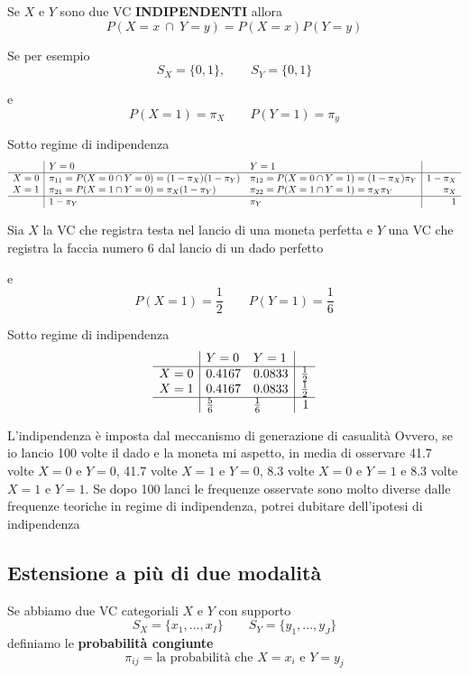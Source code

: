 \documentclass[
  11pt,
]{book}
\theoremstyle{mytheoremstyle}
\theoremstyle{mydefstyle}
\begin{document}
Se \(X\) e \(Y\) sono due VC \textbf{INDIPENDENTI} allora
\[P(X=x~\cap~Y=y)=P(X=x)P(Y=y)\]

Se per esempio
\[S_X=\{0,1\},\qquad S_Y=\{0,1\}\]

e
\[P(X=1)=\pi_X\qquad P(Y=1)=\pi_y\]

Sotto regime di indipendenza
\[
\begin{array}{c|ll|r}
 &Y=0 &Y=1 &\\
  \hline
  X=0 & \pi_{11}=P(X=0\cap Y=0) = (1-\pi_X)(1-\pi_Y)& 
  \pi_{12}=P(X=0\cap Y=1) =(1-\pi_X)\pi_Y & 1-\pi_X\\ 
  X=1 & \pi_{21}=P(X=1\cap Y=0)= \pi_X(1-\pi_Y)& 
  \pi_{22}=P(X=1\cap Y=1) =\pi_X\pi_Y & \pi_X\\ \hline
   & 1-\pi_Y & \pi_Y & 1\\ 
\end{array}
\]

Sia \(X\) la VC che registra testa nel lancio di una moneta perfetta e \(Y\) una VC che
registra la faccia numero 6 dal lancio di un dado perfetto

e
\[P(X=1)=\frac 1 2\qquad P(Y=1)=\frac 1 6\]

Sotto regime di indipendenza
\[
\begin{array}{c|ll|r}
 &Y=0 &Y=1 &\\
  \hline
  X=0 & 0.4167 & 0.0833 & \frac12\\ 
  X=1 & 0.4167 & 0.0833 & \frac12\\ 
\hline
   & \frac 56 &\frac16 & 1\\ 
\end{array}
\]

L'indipendenza è imposta dal meccanismo di generazione di casualità
Ovvero, se io lancio 100 volte il dado e la moneta mi aspetto, in media
di osservare 41.7 volte \(X=0\) e \(Y=0\), 41.7 volte \(X=1\) e \(Y=0\), 8.3 volte
\(X=0\) e \(Y=1\) e 8.3 volte \(X=1\) e \(Y=1\).
Se dopo 100 lanci le frequenze osservate sono molto diverse dalle frequenze
teoriche in regime di indipendenza, potrei dubitare dell'ipotesi di indipendenza

\subsection{Estensione a più di due modalità}\label{estensione-a-piuxf9-di-due-modalituxe0}

Se abbiamo due VC categoriali \(X\) e \(Y\) con supporto
\[S_X=\{x_1,...,x_I\} \qquad S_Y= \{y_1,...,y_J\}\] definiamo
le \textbf{probabilità congiunte}
\[\pi_{ij}=\text{la probabilità che $X=x_i$ e $Y=y_j$}\]
\end{document}
